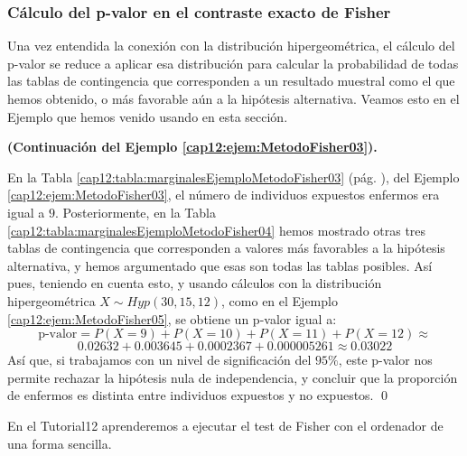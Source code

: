 
\subsubsection{Cálculo del p-valor en el contraste exacto de Fisher}

Una vez entendida la conexión con la distribución hipergeométrica, el cálculo del p-valor se reduce a aplicar esa distribución para calcular la probabilidad de todas las tablas de contingencia que corresponden a un resultado muestral como el que hemos obtenido, o más favorable aún a la hipótesis alternativa. Veamos esto en el Ejemplo que hemos venido usando en esta sección.

\begin{ejemplo}
\label{cap12:ejem:MetodoFisher06}
{\bf (Continuación del Ejemplo \ref{cap12:ejem:MetodoFisher03}).}

En la Tabla \ref{cap12:tabla:marginalesEjemploMetodoFisher03} (pág. \pageref{cap12:tabla:marginalesEjemploMetodoFisher03}), del Ejemplo \ref{cap12:ejem:MetodoFisher03}, el número de individuos expuestos enfermos era igual a $9$. Posteriormente, en la Tabla \ref{cap12:tabla:marginalesEjemploMetodoFisher04} hemos mostrado otras tres tablas de contingencia que
corresponden a valores más favorables a la hipótesis alternativa, y hemos argumentado que esas son todas las tablas posibles. Así pues, teniendo en cuenta esto, y usando cálculos con la distribución hipergeométrica $X\sim Hyp(30, 15, 12)$, como en el Ejemplo \ref{cap12:ejem:MetodoFisher05}, se obtiene un p-valor igual a:
\[\mbox{p-valor}=P(X=9)+P(X=10)+P(X=11)+P(X=12)\approx
\]
\[
0.02632+0.003645+0.0002367+0.000005261\approx 0.03022
\]
Así que, si trabajamos con un nivel de significación del $95\%$, este p-valor nos permite rechazar la hipótesis nula de independencia, y concluir que la proporción de enfermos es distinta entre individuos expuestos y no expuestos.
\qed
\end{ejemplo}
En el Tutorial12 aprenderemos a ejecutar el test de Fisher con el ordenador de una forma sencilla.

